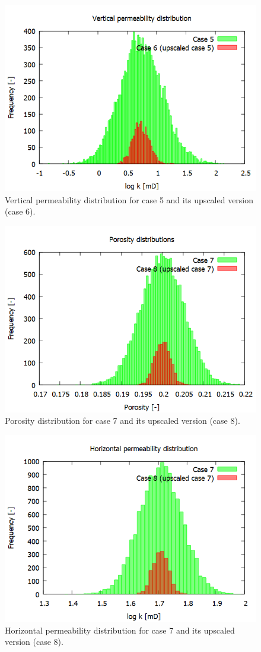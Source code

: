 \begin{figure}[H]
	\centering
	\includegraphics[width=0.8\linewidth]{Images/40}
	\caption{Vertical permeability distribution for case 5 and its upscaled version (case 6).}
	\label{fig:40}
\end{figure}

\begin{figure}[H]
	\centering
	\includegraphics[width=0.8\linewidth]{Images/43}
	\caption{Porosity distribution for case 7 and its upscaled version (case 8).}
	\label{fig:43}
\end{figure}

\begin{figure}[H]
	\centering
	\includegraphics[width=0.8\linewidth]{Images/45}
	\caption{Horizontal permeability distribution for case 7 and its upscaled version (case 8).}
	\label{fig:45}
\end{figure}

